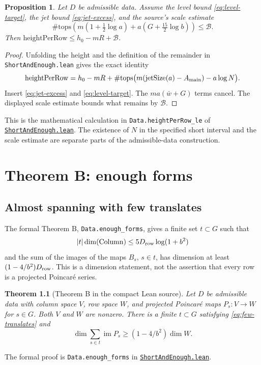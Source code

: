 \documentclass[11pt,oneside,openany]{amsbook}
\newtheorem{theorem}{Theorem}[section]
\newtheorem{proposition}[theorem]{Proposition}
\theoremstyle{remark}
\numberwithin{equation}{section}
\newcommand{\ghroot}{https://github.com/lsernau/grh-lean/blob/}
\newcommand{\ghrev}{72fead102f663d5c7a407964a13dc0cf9d977207}
\newcommand{\leanfile}[2]{%
  \href{\ghroot\ghrev/grh-compact/src/#1}{\nolinkurl{#2}}}
\begin{document}
\begin{proposition}
\label{prop:level-cancellation}
Let $D$ be admissible data. Assume the level bound
\eqref{eq:level-target}, the jet bound
\eqref{eq:jet-excess}, and the source's scale estimate
\[
\#\mathrm{tops}\left(m(1+\tfrac12\log a)
 +a(G+\tfrac{15}{2}\log b)\right)\le\mathcal B.
\]
Then $\mathrm{heightPerRow}\le h_0-mR+\mathcal B$.
\end{proposition}
\begin{proof}
Unfolding the height and the definition of the remainder
in \texttt{ShortAndEnough.lean} gives the exact identity
\[
\mathrm{heightPerRow}=h_0-mR+
\#\mathrm{tops}\bigl(m(\mathrm{jetSize}(a)-A_{\rm main})
 -a\log N\bigr).
\]
Insert \eqref{eq:jet-excess} and
\eqref{eq:level-target}. The $ma(\bar w+G)$ terms
cancel. The displayed scale estimate bounds what remains
by $\mathcal B$.
\end{proof}
This is the mathematical calculation in
\texttt{Data.heightPerRow\_le} of
\leanfile{New/Endgame/ShortAndEnough.lean}%
{ShortAndEnough.lean}. The existence of $N$ in the
specified short interval and the scale estimate are
separate parts of the admissible-data construction.

\chapter{Theorem B: enough forms}
\label{ch:enough}
\section{Almost spanning with few translates}
The formal Theorem B, \texttt{Data.enough\_forms}, gives a
finite set $t\subset G$ such that
\begin{equation}
\label{eq:few-translates}
|t|\dim(\mathrm{Column})
\le5D_{\rm row}\log(1+b^2)
\end{equation}
and the sum of the images of the maps $B_s$, $s\in t$,
has dimension at least $(1-4/b^2)D_{\rm row}$.
This is a dimension statement, not the assertion that every
row is a projected Poincar\'e series.

\begin{theorem}[Theorem B in the compact Lean source]
\label{thm:b}
Let $D$ be admissible data with column space $V$, row
space $W$, and projected Poincar\'e maps $P_s:V\to W$
for $s\in G$. Both $V$ and $W$ are nonzero. There is a
finite $t\subset G$ satisfying \eqref{eq:few-translates}
and
\[
\dim\sum_{s\in t}\operatorname{im}P_s
 \ge(1-4/b^2)\dim W.
\]
\end{theorem}
The formal proof is \texttt{Data.enough\_forms} in
\leanfile{New/Endgame/ShortAndEnough.lean}{ShortAndEnough.lean}.
\end{document}
